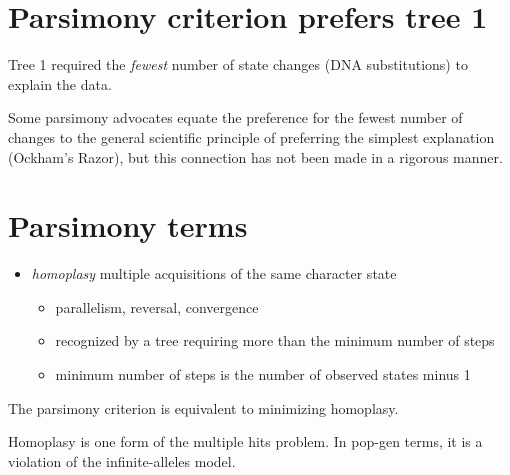 \documentclass[landscape]{foils}
\begin{document}
\myNewSlide
\section*{Parsimony criterion prefers tree 1}
Tree 1 required the {\em fewest} number of state changes (DNA substitutions) to explain the data.\par
Some parsimony advocates equate the preference for the fewest number of changes to the general scientific principle of preferring the simplest explanation (Ockham's Razor), but this connection has not been made in a rigorous manner.
\myNewSlide
\section*{Parsimony terms}
\begin{itemize}
	\item {\em homoplasy} multiple acquisitions of the same character state
	\begin{itemize}
		\item parallelism, reversal, convergence
		\item recognized by a tree requiring more than the minimum number of steps
		\item minimum number of steps is the number of observed states minus 1
	\end{itemize}
\end{itemize}
The parsimony criterion is equivalent to minimizing homoplasy.

Homoplasy is one form of the multiple hits problem. In pop-gen terms, it is a violation of the infinite-alleles model.
%
\end{document}

